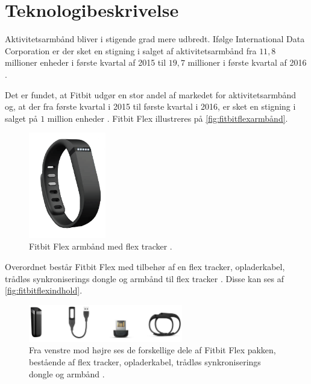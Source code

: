 \section{Teknologibeskrivelse} \label{sec:teknologibeskrivelse}
Aktivitetsarmbånd bliver i stigende grad mere udbredt. Ifølge International Data Corporation er der sket en stigning i salget af aktivitetsarmbånd fra $11,8$ millioner enheder i første kvartal af 2015 til $19,7$ millioner i første kvartal af 2016 \citep{IDC2016}.

Det er fundet, at Fitbit udgør en stor andel af markedet for aktivitetsarmbånd og, at der fra første kvartal i 2015 til første kvartal i 2016, er sket en stigning i salget på $1$ million enheder \citep{IDC2016}.  
Fitbit Flex illustreres på \autoref{fig:fitbitflexarmbånd}. 

\begin{figure}[H]
	\centering
	\includegraphics[width=0.3\textwidth]{figures/fitbitflex}
	\caption{Fitbit Flex armbånd med flex tracker \citep{fitbitflex}.}
	\label{fig:fitbitflexarmbånd}
\end{figure}

\noindent
Overordnet består Fitbit Flex med tilbehør af en flex tracker, opladerkabel, trådløs synkroniserings dongle og armbånd til flex tracker \citep{fitbitflex}. Disse kan ses af \autoref{fig:fitbitflexindhold}. 

\begin{figure}[H]
	\centering
	\includegraphics[width=0.6\textwidth]{figures/fitbitflexindhold}
	\caption{Fra venstre mod højre ses de forskellige dele af Fitbit Flex pakken, bestående af flex tracker, opladerkabel, trådløs synkroniserings dongle og armbånd \citep{fitbitflex}.}
	\label{fig:fitbitflexindhold}
\end{figure}

